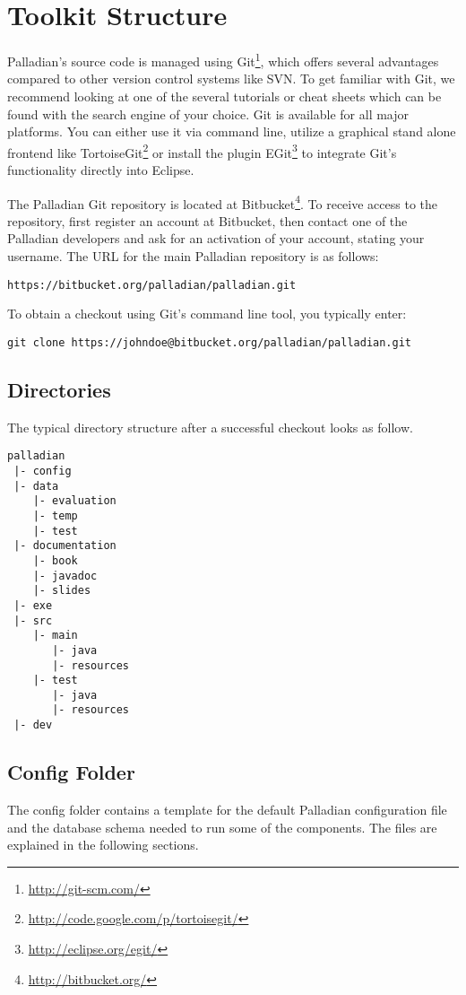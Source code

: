 \chapter{Toolkit Structure}
\label{sec:toolkitstructure}

Palladian's source code is managed using Git\footnote{\url{http://git-scm.com/}}, which offers several advantages compared to other version control systems like SVN. To get familiar with Git, we recommend looking at one of the several tutorials or cheat sheets which can be found with the search engine of your choice. Git is available for all major platforms. You can either use it via command line, utilize a graphical stand alone frontend like TortoiseGit\footnote{\url{http://code.google.com/p/tortoisegit/}} or install the plugin EGit\footnote{\url{http://eclipse.org/egit/}} to integrate Git's functionality directly into Eclipse.

The Palladian Git repository is located at Bitbucket\footnote{\url{http://bitbucket.org/}}. To receive access to the repository, first register an account at Bitbucket, then contact one of the Palladian developers and ask for an activation of your account, stating your username. The URL for the main Palladian repository is as follows:

\begin{verbatim}
https://bitbucket.org/palladian/palladian.git
\end{verbatim}

To obtain a checkout using Git's command line tool, you typically enter:

\begin{verbatim}
git clone https://johndoe@bitbucket.org/palladian/palladian.git
\end{verbatim}

\section{Directories}

The typical directory structure after a successful checkout looks as follow.

\begin{verbatim}
palladian
 |- config
 |- data
    |- evaluation
    |- temp
    |- test
 |- documentation
    |- book
    |- javadoc
    |- slides
 |- exe
 |- src
    |- main
       |- java
       |- resources
    |- test
       |- java
       |- resources
 |- dev
\end{verbatim}

\section{Config Folder}
\label{sec:config.conf}
The config folder contains a template for the default Palladian configuration file and the database schema needed to run some of the components. The files are explained in the following sections.

